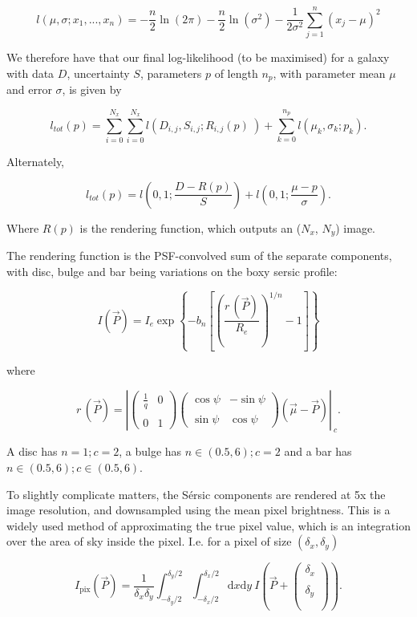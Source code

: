 \documentclass[../main.tex]{subfiles}
\begin{document}
$$l(\mu, \sigma; x_1, ..., x_n) = -\frac{n}{2}\ln(2\pi) -\frac{n}{2}\ln(\sigma^2) - \frac{1}{2\sigma^2}\sum_{j=1}^n(x_j - \mu)^2$$

We therefore have that our final log-likelihood (to be maximised) for a galaxy with data $D$, uncertainty $S$, parameters $p$ of length $n_p$, with parameter mean $\mu$ and  error $\sigma$, is given by

$$l_{tot}(p) = \sum_{i=0}^{N_x}\sum_{i=0}^{N_x}l(D_{i,j}, S_{i,j}; R_{i,j}(p)\ ) + \sum_{k=0}^{n_p}l(\mu_k, \sigma_{k}; p_k).$$

Alternately,

$$l_{tot}(p) = l\left(0, 1; \frac{D-R(p)}{S}\right) + l(0, 1; \frac{\mu - p}{\sigma}).$$

Where $R(p)$ is the rendering function, which outputs an ($N_x$, $N_y$) image.

The rendering function is the PSF-convolved sum of the separate components, with disc, bulge and bar being variations on the boxy sersic profile:

$$I(\vec{P}) = I_e \exp\left\{-b_n\left[\left(\frac{r\,(\vec{P})}{R_e}\right)^{1/n} - 1\right]\right\}$$

where

$$r\,(\vec{P}) = \left|\begin{pmatrix}
\frac{1}{q} & 0 \\\\
0 & 1
\end{pmatrix}\begin{pmatrix}
\cos\psi & -\sin\psi\\\\
\sin\psi & \cos\psi
\end{pmatrix}\left(\vec\mu - \vec{P}\right)\right|_{\ c}.$$

A disc has $n=1; c=2$, a bulge has $n\in(0.5, 6); c=2$ and a bar has $n\in(0.5, 6); c\in(0.5, 6)$.

To slightly complicate matters, the Sérsic components are rendered at 5x the image resolution, and downsampled using the mean pixel brightness. This is a widely used method of approximating the true pixel value, which is an integration over the area of sky inside the pixel. I.e. for a pixel of size $(\delta_x, \delta_y)$

$$
I_\mathrm{pix}(\vec{P}) = \frac{1}{\delta_x \delta_y}\int_{-\delta_y/2}^{\delta_y/2}\int_{-\delta_x/2}^{\delta_x/2}\mathrm{d}x\mathrm{d}y\ I\left(\vec{P} + \begin{pmatrix}
\delta_x \\\\
\delta_y \\\\
\end{pmatrix}\right).
$$
\end{document}
